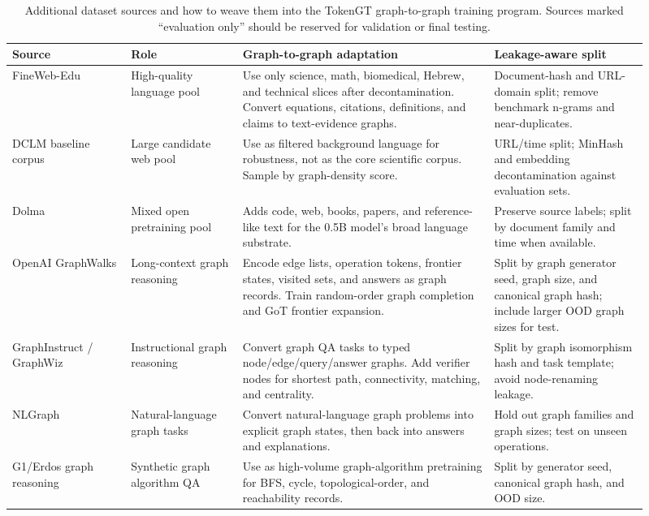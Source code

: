\documentclass[11pt]{article}
\newcommand{\1}{\mathbf{1}}
\begin{document}
{\scriptsize
\setlength{\tabcolsep}{2pt}
\begin{longtable}{p{0.17\linewidth}p{0.16\linewidth}p{0.36\linewidth}p{0.22\linewidth}}
\caption{Additional dataset sources and how to weave them into the TokenGT graph-to-graph training program. Sources marked ``evaluation only'' should be reserved for validation or final testing.}\\
\toprule
Source & Role & Graph-to-graph adaptation & Leakage-aware split \\
\midrule
\endhead
FineWeb-Edu \cite{FineWebEdu2024} & High-quality language pool & Use only science, math, biomedical, Hebrew, and technical slices after decontamination. Convert equations, citations, definitions, and claims to text-evidence graphs. & Document-hash and URL-domain split; remove benchmark n-grams and near-duplicates. \\
DCLM baseline corpus \cite{DCLM2024} & Large candidate web pool & Use as filtered background language for robustness, not as the core scientific corpus. Sample by graph-density score. & URL/time split; MinHash and embedding decontamination against evaluation sets. \\
Dolma \cite{Dolma2024} & Mixed open pretraining pool & Adds code, web, books, papers, and reference-like text for the 0.5B model's broad language substrate. & Preserve source labels; split by document family and time when available. \\
OpenAI GraphWalks \cite{GraphWalks2026} & Long-context graph reasoning & Encode edge lists, operation tokens, frontier states, visited sets, and answers as graph records. Train random-order graph completion and GoT frontier expansion. & Split by graph generator seed, graph size, and canonical graph hash; include larger OOD graph sizes for test. \\
GraphInstruct / GraphWiz \cite{GraphInstruct2024} & Instructional graph reasoning & Convert graph QA tasks to typed node/edge/query/answer graphs. Add verifier nodes for shortest path, connectivity, matching, and centrality. & Split by graph isomorphism hash and task template; avoid node-renaming leakage. \\
NLGraph \cite{NLGraph2023} & Natural-language graph tasks & Convert natural-language graph problems into explicit graph states, then back into answers and explanations. & Hold out graph families and graph sizes; test on unseen operations. \\
G1/Erdos graph reasoning \cite{ErdosGraphReasoning2025} & Synthetic graph algorithm QA & Use as high-volume graph-algorithm pretraining for BFS, cycle, topological-order, and reachability records. & Split by generator seed, canonical graph hash, and OOD size. \\

\end{longtable}}
\end{document}
